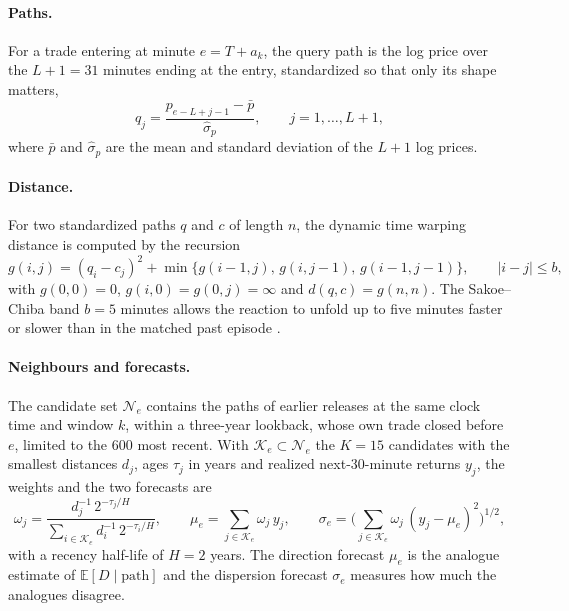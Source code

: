 \paragraph{Paths.} For a trade entering at minute $e=T+a_k$, the query path is the log price over
the $L+1=31$ minutes ending at the entry, standardized so that only its shape matters,
\begin{equation}\label{eq:path}
  q_j = \frac{p_{e-L+j-1}-\bar p}{\hat\sigma_p},\qquad j=1,\dots,L+1 ,
\end{equation}
where $\bar p$ and $\hat\sigma_p$ are the mean and standard deviation of the $L+1$ log prices.

\paragraph{Distance.} For two standardized paths $q$ and $c$ of length $n$, the dynamic time
warping distance is computed by the recursion
\begin{equation}\label{eq:dtw}
  g(i,j) = (q_i-c_j)^2 + \min\{g(i-1,j),\,g(i,j-1),\,g(i-1,j-1)\},
  \qquad |i-j|\le b,
\end{equation}
with $g(0,0)=0$, $g(i,0)=g(0,j)=\infty$ and $d(q,c)=g(n,n)$. The Sakoe--Chiba band $b=5$ minutes
allows the reaction to unfold up to five minutes faster or slower than in the matched past
episode \citep{Sakoe1978, Berndt1994}.

\paragraph{Neighbours and forecasts.} The candidate set $\mathcal{N}_e$ contains the paths of
earlier releases at the same clock time and window $k$, within a three-year lookback, whose own
trade closed before $e$, limited to the 600 most recent. With $\mathcal{K}_e\subset\mathcal{N}_e$
the $K=15$ candidates with the smallest distances $d_j$, ages $\tau_j$ in years and realized
next-30-minute returns $y_j$, the weights and the two forecasts are
\begin{equation}\label{eq:dtwforecast}
  \omega_j = \frac{d_j^{-1}\,2^{-\tau_j/H}}{\sum_{i\in\mathcal{K}_e} d_i^{-1}\,2^{-\tau_i/H}},\qquad
  \mu_e = \sum_{j\in\mathcal{K}_e}\omega_j\,y_j,\qquad
  \sigma_e = \Big(\sum_{j\in\mathcal{K}_e}\omega_j\,(y_j-\mu_e)^2\Big)^{1/2},
\end{equation}
with a recency half-life of $H=2$ years. The direction forecast $\mu_e$ is the analogue estimate of
$\mathbb{E}[D\mid\text{path}]$ and the dispersion forecast $\sigma_e$ measures how much the analogues
disagree.


